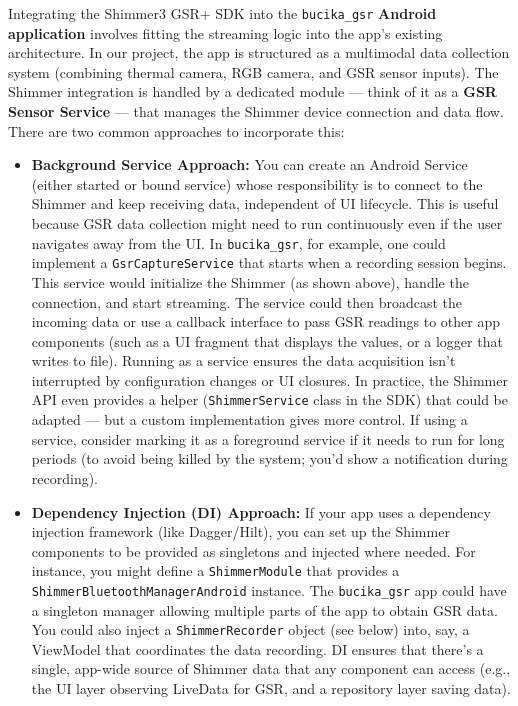 Integrating the Shimmer3 GSR+ SDK into the \texttt{bucika_gsr} \textbf{Android
application} involves fitting the streaming logic into the app's
existing architecture. In our project, the app is structured as a
multimodal data collection system (combining thermal camera, RGB camera,
and GSR sensor
inputs)\cite{CortisolStressIndicator2020}.
The Shimmer integration is handled by a dedicated module --- think of it
as a \textbf{GSR Sensor Service} --- that manages the Shimmer device
connection and data flow. There are two common approaches to incorporate
this:

\begin{itemize}
\item \textbf{Background Service Approach:} You can create an Android Service
  (either started or bound service) whose responsibility is to connect
  to the Shimmer and keep receiving data, independent of UI lifecycle.
  This is useful because GSR data collection might need to run
  continuously even if the user navigates away from the UI. In
  \texttt{bucika_gsr}, for example, one could implement a \texttt{GsrCaptureService}
  that starts when a recording session begins. This service would
  initialize the Shimmer (as shown above), handle the connection, and
  start streaming. The service could then broadcast the incoming data or
  use a callback interface to pass GSR readings to other app components
  (such as a UI fragment that displays the values, or a logger that
  writes to file). Running as a service ensures the data acquisition
  isn't interrupted by configuration changes or UI closures. In
  practice, the Shimmer API even provides a helper (\texttt{ShimmerService}
  class in the SDK) that could be adapted --- but a custom implementation
  gives more control. If using a service, consider marking it as a
  foreground service if it needs to run for long periods (to avoid being
  killed by the system; you'd show a notification during recording).

\item \textbf{Dependency Injection (DI) Approach:} If your app uses a dependency
  injection framework (like Dagger/Hilt), you can set up the Shimmer
  components to be provided as singletons and injected where needed. For
  instance, you might define a \texttt{ShimmerModule} that provides a
  \texttt{ShimmerBluetoothManagerAndroid} instance. The \texttt{bucika_gsr} app could
  have a singleton manager allowing multiple parts of the app to obtain
  GSR data. You could also inject a \texttt{ShimmerRecorder} object (see below)
  into, say, a ViewModel that coordinates the data recording. DI ensures
  that there's a single, app-wide source of Shimmer data that any
  component can access (e.g., the UI layer observing LiveData for GSR,
  and a repository layer saving data).

\end{itemize}
